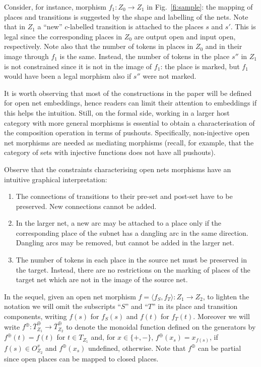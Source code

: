 \documentclass{LMCS}
\newcommand{\mon}[1]{\ensuremath{{#1}^\oplus}}
\newcommand{\monSub}[2]{\ensuremath{{#1}_{#2}^\oplus}}
\begin{document}
Consider, for instance, morphism $f_1 : Z_0 \to Z_1$ in
Fig.~\ref{fi:sample}: the mapping of places and transitions
is suggested by the shape and labelling of the nets.
Note that in
$Z_1$ a ``new'' $c$-labelled transition is attached to the places $s$
and $s'$. This is legal since the corresponding places in $Z_0$ are
output open and input open, respectively. Note also that the
number of tokens in places in $Z_0$ and in their image through $f_1$
is the same.  Instead, the number of tokens in the place $s''$ in
$Z_1$ is not constrained since it is not in the image of $f_1$: the
place is marked, but $f_1$ would have been a legal morphism also if
$s''$ were not marked.

It is worth observing that most of the constructions in the paper will
be defined for open net embeddings, hence readers can limit their
attention to embeddings if this helps the intuition. Still, on the
formal side, working in a larger host category with more general
morphisms is essential to obtain a characterisation of the composition
operation in terms of pushouts. Specifically, non-injective open net
morphisms are needed as mediating morphisms (recall, for example, that
the category of sets with injective functions does not have all
pushouts).



Observe that the constraints characterising open nets morphisms have
an intuitive graphical interpretation:

\begin{enumerate}[$\bullet$]
\item
The connections of transitions to their pre-set and post-set have
  to be preserved. New connections cannot be added.

\item
In the larger net, a new arc may be attached to a place only if
  the corresponding place of the subnet has a dangling arc in the
  same direction. Dangling arcs may be removed, but cannot be added
  in the larger net.

\item 
The number of tokens in each place in the source net must be preserved in
  the target. Instead, there are no restrictions on the marking of places of
  the target net which are not in the image of the source net.
\end{enumerate}


In the sequel, given an open net morphism $f = \langle f_S, f_T
\rangle : Z_1 \to Z_2$, to lighten the notation we will omit the
subscripts ``$S$'' and ``$T$'' in its place and transition components,
writing $f(s)$ for $f_S(s)$ and $f(t)$ for $f_T(t)$.
Moreover we will write $\mon{f} : \monSub{\bar{T}}{{Z_1}} \to
\monSub{\bar{T}}{{Z_2}}$ to denote the monoidal function defined on the
generators by $\mon{f}(t) = f(t)$ for $t \in T_{Z_1}$ 
and, for $x \in \{ +, -\}$,
$\mon{f}(x_{s}) = x_{f(s)}$, if $f(s) \in O_{Z_2}^x$ and
$\mon{f}(x_{s})$ undefined, otherwise. Note that  
$\mon{f}$ can be partial since open places can be mapped to closed
places.
\end{document}
